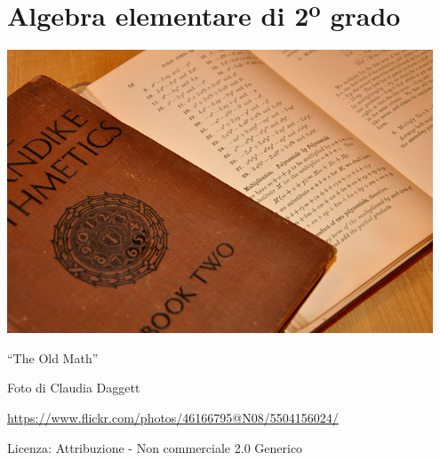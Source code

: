 \part{Algebra elementare di 2\textsuperscript{o} grado}

\includegraphics[width=0.95\textwidth]{img/old_math.jpg}
  \begin{center}
    {\large ``The Old Math''}\par
    Foto di Claudia Daggett\par
    \url{https://www.flickr.com/photos/46166795@N08/5504156024/}\par
    Licenza: Attribuzione - Non commerciale 2.0 Generico\par
  \end{center}
\clearpage
\cleardoublepage
